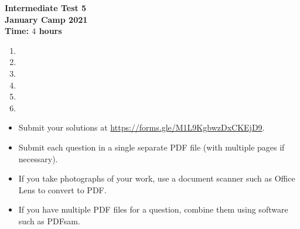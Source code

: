 \documentclass{article}
\begin{document}
\thispagestyle{empty}

\begin{center}
  \textbf{\Large Intermediate Test 5}
  \\ \vspace{1em}
  \textbf{\large January Camp 2021}
  \\ \vspace{1em}
  \textbf{\large Time: $4$ hours}
\end{center}

\vspace{12pt}

\begin{enumerate}[1.]

\item %


\item %


\item %


\item %


\item %


\item %

\end{enumerate}


\vfill
\begin{itemize}
	\item Submit your solutions at \url{https://forms.gle/M1L9KgbwzDxCKEjD9}.
	\item Submit each question in a single separate PDF file (with multiple pages if necessary).
	\item If you take photographs of your work, use a document scanner such as Office Lens to convert to PDF.
	\item If you have multiple PDF files for a question, combine them using software such as PDFsam.
\end{itemize}

\vfill
\centering
\begin{BVerbatim}
\end{BVerbatim}
\end{document}
